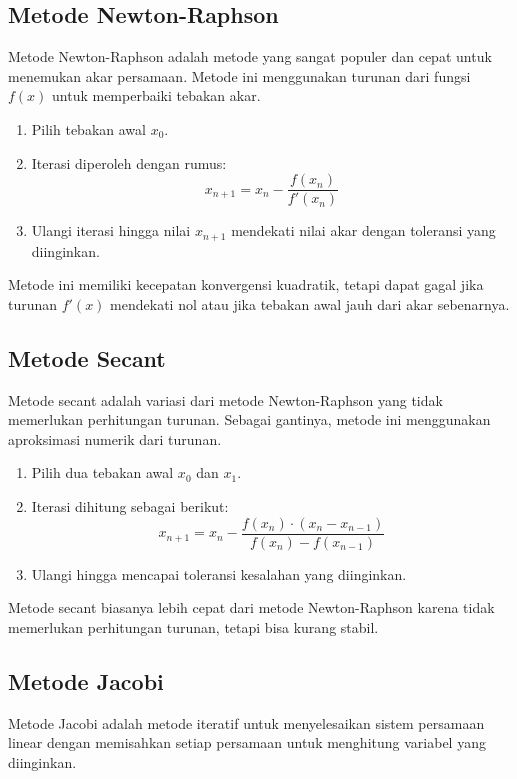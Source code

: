 \documentclass[a4paper,extrafontsizes, 9pt]{memoir}
\begin{document}
\begin{multicols}{3}
        \subsection{\small Metode Newton-Raphson}
          Metode Newton-Raphson adalah metode yang sangat populer dan cepat untuk menemukan akar persamaan. Metode ini menggunakan turunan dari fungsi \(f(x)\) untuk memperbaiki tebakan akar.
          \begin{enumerate}
              \item Pilih tebakan awal \(x_0\).
              \item Iterasi diperoleh dengan rumus:
              \[
              x_{n+1} = x_n - \frac{f(x_n)}{f'(x_n)}
              \]
              \item Ulangi iterasi hingga nilai \(x_{n+1}\) mendekati nilai akar dengan toleransi yang diinginkan.
          \end{enumerate}
          Metode ini memiliki kecepatan konvergensi kuadratik, tetapi dapat gagal jika turunan \(f'(x)\) mendekati nol atau jika tebakan awal jauh dari akar sebenarnya.

        \subsection{\small Metode Secant}
          Metode secant adalah variasi dari metode Newton-Raphson yang tidak memerlukan perhitungan turunan. Sebagai gantinya, metode ini menggunakan aproksimasi numerik dari turunan.
          \begin{enumerate}
              \item Pilih dua tebakan awal \(x_0\) dan \(x_1\).
              \item Iterasi dihitung sebagai berikut:
              \[
              x_{n+1} = x_n - \frac{f(x_n) \cdot (x_n - x_{n-1})}{f(x_n) - f(x_{n-1})}
              \]
              \item Ulangi hingga mencapai toleransi kesalahan yang diinginkan.
          \end{enumerate}
          Metode secant biasanya lebih cepat dari metode Newton-Raphson karena tidak memerlukan perhitungan turunan, tetapi bisa kurang stabil.

          \subsection*{\small Metode Jacobi}
          Metode Jacobi adalah metode iteratif untuk menyelesaikan sistem persamaan linear dengan memisahkan setiap persamaan untuk menghitung variabel yang diinginkan.


\end{multicols}
\end{document}
